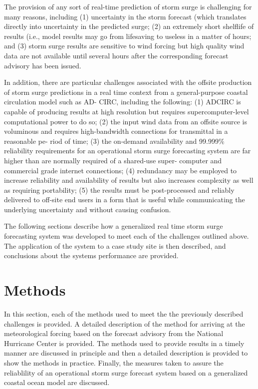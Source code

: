 \documentclass[12pt]{article}
\begin{document}
The provision of any sort of real-time prediction of storm surge is 
challenging for many reasons, including (1) uncertainty in the storm 
forecast (which translates directly into uncertainty in the 
predicted surge; (2) an extremely short shelflife of results (i.e., 
model results may go from lifesaving to useless in a matter of 
hours; and (3) storm surge results are sensitive to wind forcing but 
high quality wind data are not available until several hours after 
the corresponding forecast advisory has been issued. 

In addition, there are particular challenges associated with the 
offsite production of storm surge predictions in a real time 
context from a general-purpose coastal circulation model such as AD- 
CIRC, including the following: (1) ADCIRC is capable of producing 
results at high resolution but requires supercomputer-level 
computational power to do so; (2) the input wind data from an 
offsite source is voluminous and requires high-bandwidth connections 
for transmittal in a reasonable pe- riod of time; (3) the on-demand 
availability and 99.999\% reliability requirements for an 
operational storm surge forecasting system are far higher than are 
normally required of a shared-use super- computer and commercial 
grade internet connections; (4) redundancy may be employed to 
increase reliability and availability of results but also increases 
complexity as well as requiring portability; (5) the results must be 
post-processed and reliably delivered to off-site end users in a 
form that is useful while communicating the underlying uncertainty 
and without causing confusion. 

The following sections describe how a generalized real time storm 
surge forecasting system was developed to meet each of the 
challenges outlined above. The application of the system to a case 
study site is then described, and conclusions about the systems 
performance are provided.

\section{Methods}

In this section, each of the methods used to meet the the previously 
described challenges is provided. A detailed description of the 
method for arriving at the meteorological forcing based on the 
forecast advisory from the National Hurricane Center is provided. 
The methods used to provide results in a timely manner are discussed 
in principle and then a detailed description is provided to show the 
methods in practice. Finally, the measures taken to assure the 
reliablility of an operational storm surge forecast system based on 
a generalized coastal ocean model are discussed.
\end{document}
